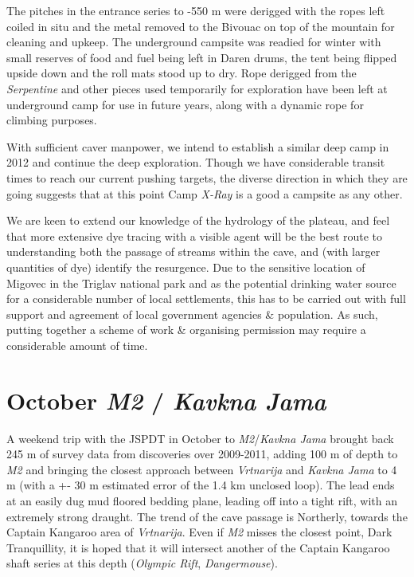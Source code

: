 The pitches in the entrance series to -550 m were derigged with the
ropes left coiled in situ and the metal removed to the Bivouac on top of
the mountain for cleaning and upkeep. The underground campsite was
readied for winter with small reserves of food and fuel being left in
Daren drums, the tent being flipped upside down and the roll mats stood
up to dry. Rope derigged from the \emph{Serpentine} and other pieces
used temporarily for exploration have been left at underground camp for
use in future years, along with a dynamic rope for climbing purposes.

With sufficient caver manpower, we intend to establish a similar deep
camp in 2012 and continue the deep exploration. Though we have
considerable transit times to reach our current pushing targets, the
diverse direction in which they are going suggests that at this point
Camp \emph{X-Ray} is a good a campsite as any other.

We are keen to extend our knowledge of the hydrology of the plateau, and
feel that more extensive dye tracing with a visible agent will be the
best route to understanding both the passage of streams within the cave,
and (with larger quantities of dye) identify the resurgence. Due to the
sensitive location of Migovec in the Triglav national park and as the
potential drinking water source for a considerable number of local
settlements, this has to be carried out with full support and agreement
of local government agencies \& population. As such, putting together a
scheme of work \& organising permission may require a considerable
amount of time.

\hypertarget{october-m2-kavkna-jama}{%
\section{\texorpdfstring{October \emph{M2} / \emph{Kavkna
Jama}}{October M2 / Kavkna Jama}}\label{october-m2-kavkna-jama}}

A weekend trip with the JSPDT in October to \emph{M2}/\emph{Kavkna Jama}
brought back 245 m of survey data from discoveries over 2009-2011,
adding 100 m of depth to \emph{M2} and bringing the closest approach
between \emph{Vrtnarija} and \emph{Kavkna Jama} to 4 m (with a +- 30 m
estimated error of the 1.4 km unclosed loop). The lead ends at an easily
dug mud floored bedding plane, leading off into a tight rift, with an
extremely strong draught. The trend of the cave passage is Northerly,
towards the Captain Kangaroo area of \emph{Vrtnarija}. Even if \emph{M2}
misses the closest point, Dark Tranquillity, it is hoped that it will
intersect another of the Captain Kangaroo shaft series at this depth
(\emph{Olympic Rift}, \emph{Dangermouse}).

